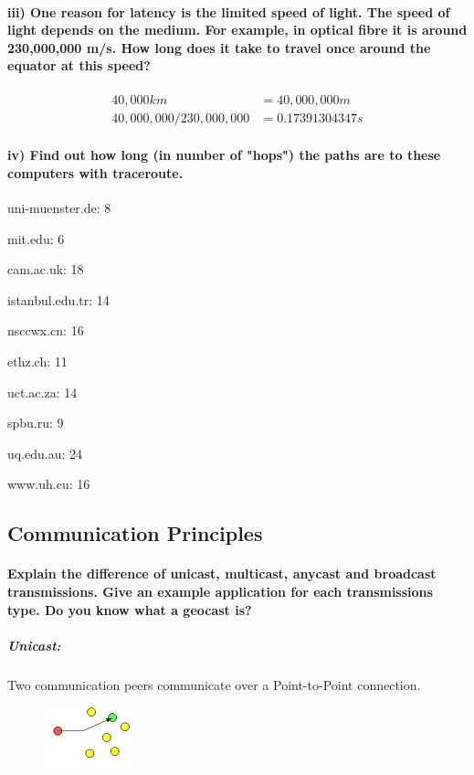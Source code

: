 \documentclass[a4paper,12pt]{article}
\begin{document}
    \paragraph{iii) One reason for latency is the limited speed of light. The speed of light depends
                on the medium. For example, in optical fibre it is around 230,000,000 m/s. How long
                does it take to travel once around the equator at this speed?}
    
    \begin{align*}
        40,000km &= 40,000,000m \\
        40,000,000 / 230,000,000 &= 0.17391304347s
    \end{align*}

    \paragraph{iv) Find out how long (in number of "hops") the paths are to these computers with 
                traceroute.}
    \begin{description}[font=$\bullet$~\normalfont\scshape]
    \item uni-muenster.de: 8
    \item mit.edu: 6
    \item cam.ac.uk: 18
    \item istanbul.edu.tr: 14
    \item nsccwx.cn: 16
    \item ethz.ch: 11
    \item uct.ac.za: 14
    \item spbu.ru: 9
    \item uq.edu.au: 24
    \item www.uh.cu: 16
    \end{description}


    \subsection{Communication Principles}
    \paragraph{Explain the difference of unicast, multicast, anycast and broadcast transmissions.
                Give an example application for each transmissions type. Do you know what a geocast
                is?}
    \subparagraph{Unicast:} 
    Two communication peers communicate over a Point-to-Point connection.
    \begin{figure}[h!]
        \includegraphics[width=0.3\linewidth]{Unicast.png}
    \end{figure}
\end{document}
